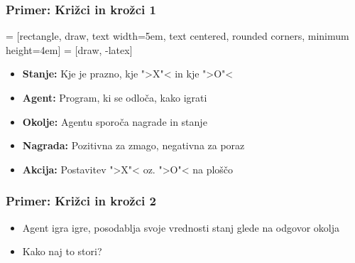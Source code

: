 \documentclass{beamer}    %
\begin{document}
\begin{frame}
    \frametitle{Primer: Križci in krožci 1}
     = [rectangle, draw, 
    text width=5em, text centered, rounded corners, minimum height=4em]
     = [draw, -latex]
    \begin{itemize}
        \item \textbf{Stanje:} Kje je prazno, kje ">X"< in kje ">O"<
        \item \textbf{Agent:} Program, ki se odloča, kako igrati
        \item \textbf{Okolje:} Agentu sporoča nagrade in stanje
        \item \textbf{Nagrada:} Pozitivna za zmago, negativna za poraz
        \item \textbf{Akcija:} Postavitev ">X"< oz. ">O"< na ploščo
    \end{itemize}
\end{frame}


\begin{frame}
    \frametitle{Primer: Križci in krožci 2}
    \begin{itemize}
        \item Agent igra igre, posodablja svoje vrednosti stanj glede na odgovor okolja
        \item Kako naj to stori?
    \end{itemize}
\end{frame}
\end{document}
